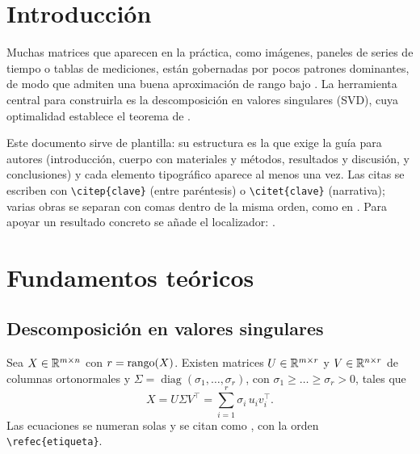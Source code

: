 
\section{Introducción}
\label{sec:intro}

Muchas matrices que aparecen en la práctica, como imágenes, paneles de series de tiempo o tablas de mediciones, están gobernadas por pocos patrones dominantes, de modo que admiten una buena aproximación de rango bajo \citep{fessler2024linear}. La herramienta central para construirla es la descomposición en valores singulares (SVD), cuya optimalidad establece el teorema de \citet{eckart1936approximation}.

Este documento sirve de plantilla: su estructura es la que exige la guía para autores (introducción, cuerpo con materiales y métodos, resultados y discusión, y conclusiones) y cada elemento tipográfico aparece al menos una vez. Las citas se escriben con \verb|\citep{clave}| (entre paréntesis) o \verb|\citet{clave}| (narrativa); varias obras se separan con comas dentro de la misma orden, como en \citep{golub2013matrix,candes2009exact}. Para apoyar un resultado concreto se añade el localizador: \citep[cap.~7]{fessler2024linear}.

\section{Fundamentos teóricos}
\label{sec:teoria}

\subsection{Descomposición en valores singulares}

Sea $X\in\mathbb{R}^{m\times n}$ con $r=\operatorname{rango}(X)$. Existen matrices $U\in\mathbb{R}^{m\times r}$ y $V\in\mathbb{R}^{n\times r}$ de columnas ortonormales y $\Sigma=\operatorname{diag}(\sigma_1,\dots,\sigma_r)$, con $\sigma_1\ge\dots\ge\sigma_r>0$, tales que
\begin{equation}
  X = U\Sigma V^{\top} = \sum_{i=1}^{r}\sigma_i\,u_i v_i^{\top}.
  \label{eq:svd}
\end{equation}
Las ecuaciones se numeran solas y se citan como , con la orden \verb|\refec{etiqueta}|.

